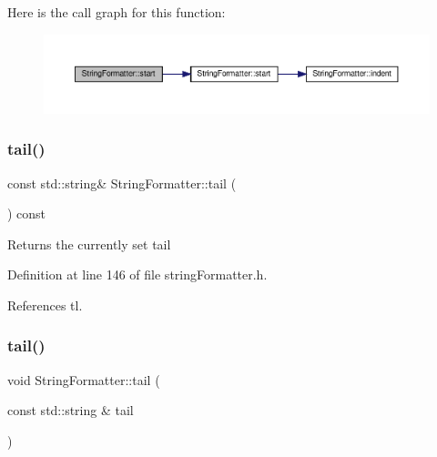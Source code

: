 Here is the call graph for this function\+:
\nopagebreak
\begin{figure}[H]
\begin{center}
\leavevmode
\includegraphics[width=350pt]{classStringFormatter_aa952e1ec1047f7f0e746f678042da824_cgraph}
\end{center}
\end{figure}
\mbox{\label{classStringFormatter_af87d5cdd41e7a3d30893ae2d4cc99a99}} 
\subsubsection{\texorpdfstring{tail()}{tail()}\hspace{0.1cm}{\footnotesize\ttfamily [1/2]}}
{\footnotesize\ttfamily const std\+::string\& String\+Formatter\+::tail (\begin{DoxyParamCaption}{ }\end{DoxyParamCaption}) const\hspace{0.3cm}{\ttfamily [inline]}}

\begin{DoxyReturn}{Returns}
the currently set tail 
\end{DoxyReturn}


Definition at line 146 of file string\+Formatter.\+h.



References tl.

\mbox{\label{classStringFormatter_ad7a18b6b3c5d10addf6055dd910695c2}} 
\subsubsection{\texorpdfstring{tail()}{tail()}\hspace{0.1cm}{\footnotesize\ttfamily [2/2]}}
{\footnotesize\ttfamily void String\+Formatter\+::tail (\begin{DoxyParamCaption}\item[{const std\+::string \&}]{tail }\end{DoxyParamCaption})\hspace{0.3cm}{\ttfamily [inline]}}

